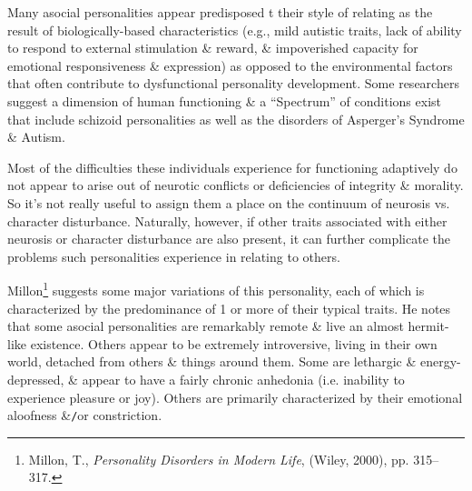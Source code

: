 \documentclass{article}
\numberwithin{equation}{section}
\begin{document}
Many asocial personalities appear predisposed t their style of relating as the result of biologically-based characteristics (e.g., mild autistic traits, lack of ability to respond to external stimulation \& reward, \& impoverished capacity for emotional responsiveness \& expression) as opposed to the environmental factors that often contribute to dysfunctional personality development. Some researchers suggest a dimension of human functioning \& a ``Spectrum'' of conditions exist that include schizoid personalities as well as the disorders of Asperger's Syndrome \& Autism.

Most of the difficulties these individuals experience for functioning adaptively do not appear to arise out of neurotic conflicts or deficiencies of integrity \& morality. So it's not really useful to assign them a place on the continuum of neurosis vs. character disturbance. Naturally, however, if other traits associated with either neurosis or character disturbance are also present, it can further complicate the problems such personalities experience in relating to others.

Millon\footnote{Millon, T., \textit{Personality Disorders in Modern Life}, (Wiley, 2000), pp. 315--317.} suggests some major variations of this personality, each of which is characterized by the predominance of 1 or more of their typical traits. He notes that some asocial personalities are remarkably remote \& live an almost hermit-like existence. Others appear to be extremely introversive, living in their own world, detached from others \& things around them. Some are lethargic \& energy-depressed, \& appear to have a fairly chronic anhedonia (i.e. inability to experience pleasure or joy). Others are primarily characterized by their emotional aloofness \&\texttt{/}or constriction.
\end{document}
